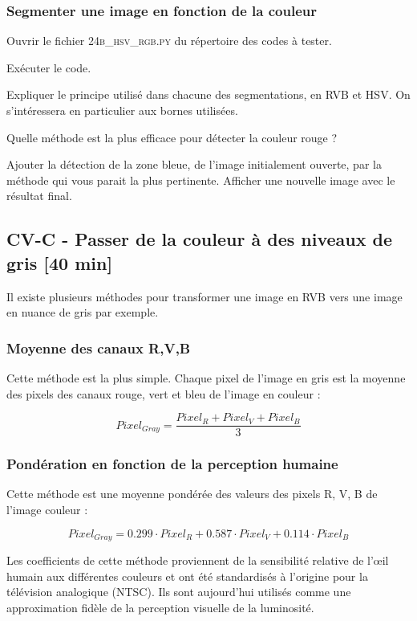 \documentclass[a4paper,11pt,titlepage]{article} %
\begin{document}
\subsubsection{Segmenter une image en fonction de la couleur}

\Manip Ouvrir le fichier \textsc{24b\_hsv\_rgb.py} du répertoire des codes à tester.

\Manip Exécuter le code.

\Quest Expliquer le principe utilisé dans chacune des segmentations, en RVB et HSV. On s'intéressera en particulier aux bornes utilisées.

\Quest Quelle méthode est la plus efficace pour détecter la couleur rouge ?

\Manip Ajouter la détection de la zone bleue, de l'image initialement ouverte, par la méthode qui vous parait la plus pertinente. Afficher une nouvelle image avec le résultat final.


\subsection{CV-C - Passer de la couleur à des niveaux de gris {[40 min]}}

Il existe plusieurs méthodes pour transformer une image en RVB vers une image en nuance de gris par exemple.

\subsubsection{Moyenne des canaux R,V,B}

Cette méthode est la plus simple. Chaque pixel de l'image en gris est la moyenne des pixels des canaux rouge, vert et bleu de l'image en couleur :

$$Pixel_{Gray} = \frac{Pixel_{R} + Pixel_{V} + Pixel_{B}}{3}$$ 


\subsubsection{Pondération en fonction de la perception humaine}

Cette méthode est une moyenne pondérée des valeurs des pixels R, V, B de l'image couleur : 

$$Pixel_{Gray} = 0.299 \cdot Pixel_{R} + 0.587 \cdot Pixel_{V} + 0.114 \cdot Pixel_{B}$$ 


Les coefficients de cette méthode proviennent de la sensibilité relative de l'œil humain aux différentes couleurs et ont été standardisés à l'origine pour la télévision analogique (NTSC). Ils sont aujourd'hui utilisés comme une approximation fidèle de la perception visuelle de la luminosité.
\end{document}
